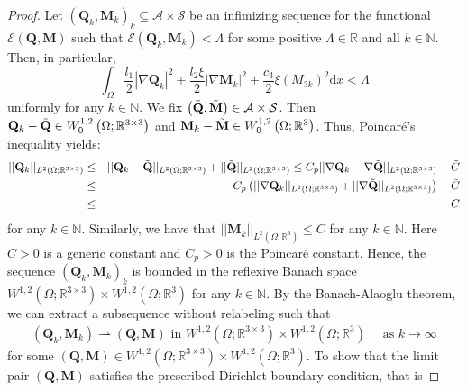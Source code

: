 \documentclass{article}
\def\Qvec{\mathbf{Q}}
\def \Mvec{\mathbf{M}}
\def\d{\mathrm{d}}
\begin{document}
\begin{proof}
Let $\left(\Qvec_k, \Mvec_k\right)_k \subseteq \mathcal{A} \times \mathcal{S}$ be an infimizing sequence for the functional $\mathcal{E}\left(\Qvec, \Mvec\right)$ such that $\mathcal{E}\left(\Qvec_k, \Mvec_k\right)<\Lambda$ for some positive $\Lambda\in\mathbb{R}$ and all $k\in \mathbb{N}$. Then, in particular,
$$ \int_{\Omega} \frac{l_1}{2}|\nabla \Qvec_k|^2 + \frac{l_2\xi}{2}|\nabla \Mvec_k|^2 + \frac{c_3}{2}\xi\left(M_{3k}\right)^2\d x < \Lambda$$
uniformly for any $k\in\mathbb{N}$.
We fix $\left(\Tilde{\Qvec}, \Tilde{\Mvec}\right)\in\mathcal{A}\times\mathcal{S}$. Then $\Qvec_k - \Tilde{\Qvec} \in W^{1,2}_{0}\left(\Omega; \mathbb{R}^{3\times 3} \right)$ and $\Mvec_k - \Tilde{\Mvec}\in W^{1,2}_{0}\left(\Omega; \mathbb R^3\right)$. Thus, Poincar\'e's inequality yields:
\begin{eqnarray}
||\Qvec_k||_{L^2\left(\Omega; \mathbb R^{3\times 3}\right)}&\le&||\Qvec_k - \Tilde{\Qvec}||_{L^2\left(\Omega; \mathbb R^{3\times 3}\right)} + ||\Tilde{\Qvec}||_{L^2\left(\Omega; \mathbb R^{3\times 3}\right)} \le C_p||\nabla \Qvec_k - \nabla \Tilde{\Qvec}||_{L^2\left(\Omega; \mathbb R^{3\times 3}\right)} + \Tilde{C} \nonumber \\ &\le&C_p\left(||\nabla \Qvec_k||_{L^2\left(\Omega; \mathbb R^{3\times 3}\right)} + ||\nabla \Tilde{\Qvec}||_{L^2\left(\Omega; \mathbb R^{3\times 3}\right)}\right) + \Tilde{C}\nonumber\\
&\le& C\nonumber
\end{eqnarray}
for any $k\in\mathbb{N}$. Similarly, we have that $||\Mvec_k||_{L^2\left(\Omega; \mathbb R^3\right)}\le C$ for any $k\in\mathbb{N}$. Here $C>0$ is a generic constant and $C_p>0$ is the Poincar\'e constant.
Hence, the sequence $\left(\Qvec_k, \Mvec_k\right)_k$ is bounded in the reflexive Banach space $W^{1,2}\left(\Omega; \mathbb R^{3\times 3}\right)\times W^{1,2}\left(\Omega; \mathbb R^3\right)$ for any $k\in\mathbb{N}$.
By the Banach-Alaoglu theorem, we can extract a subsequence without relabeling such that
\begin{eqnarray}\label{eq:ex6}
\left(\Qvec_k, \Mvec_k\right)\rightharpoonup \left(\Qvec, \Mvec\right) \mbox{ in } W^{1,2}\left(\Omega; \mathbb R^{3\times 3}\right)\times W^{1,2}\left(\Omega; \mathbb R^3\right) \quad \mbox{ as } k\to \infty
\end{eqnarray} 
for some $(\Qvec,\Mvec) \in W^{1,2}\left(\Omega; \mathbb R^{3\times 3}\right)\times W^{1,2}\left(\Omega; \mathbb R^3\right)$.
To show that the limit pair $\left(\Qvec, \Mvec\right)$ satisfies the prescribed Dirichlet boundary condition, that is 

\end{proof}
\end{document}
